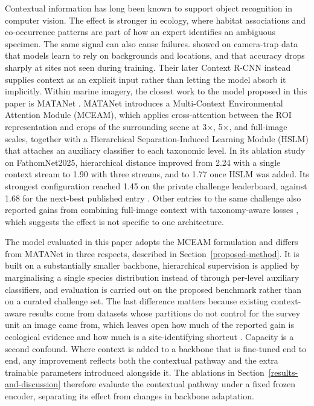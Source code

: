 \documentclass[preprint,12pt]{elsarticle}
\begin{document}
Contextual information has long been known to support object recognition
in computer vision\citep{ref53,ref54,ref55,ref56}. The effect is stronger in ecology,
where habitat associations and co-occurrence patterns are part of how an
expert identifies an ambiguous specimen. The same signal can also cause
failures. \citet{ref18} showed on
camera-trap data that models learn to rely on backgrounds and locations,
and that accuracy drops sharply at sites not seen during training. Their
later Context R-CNN \citep{ref57} instead
supplies context as an explicit input rather than letting the model
absorb it implicitly. Within marine imagery, the closest work to the
model proposed in this paper is MATANet
\citep{ref26}. MATANet introduces a Multi-Context
Environmental Attention Module (MCEAM), which applies cross-attention
between the ROI representation and crops of the surrounding scene at 3×,
5×, and full-image scales, together with a Hierarchical
Separation-Induced Learning Module (HSLM) that attaches an auxiliary
classifier to each taxonomic level. In its ablation study on
FathomNet2025\citep{ref30}, hierarchical distance
improved from 2.24 with a single context stream to 1.90 with three
streams, and to 1.77 once HSLM was added. Its strongest configuration
reached 1.45 on the private challenge leaderboard, against 1.68 for the
next-best published entry \citep{ref26}. Other
entries to the same challenge also reported gains from combining
full-image context with taxonomy-aware losses
\citep{ref30}, which suggests the effect is not
specific to one architecture.

The model evaluated in this paper adopts the MCEAM formulation and
differs from MATANet \citep{ref26} in three
respects, described in Section~\ref{proposed-method}. It is built on a substantially smaller
backbone, hierarchical supervision is applied by marginalising a single
species distribution instead of through per-level auxiliary classifiers,
and evaluation is carried out on the proposed benchmark rather than on a
curated challenge set. The last difference matters because existing
context-aware results come from datasets whose partitions do not control
for the survey unit an image came from, which leaves open how much of
the reported gain is ecological evidence and how much is a
site-identifying shortcut \citep{ref17,ref18,ref58} . Capacity is a second confound.
Where context is added to a backbone that is fine-tuned end to end, any
improvement reflects both the contextual pathway and the extra trainable
parameters introduced alongside it. The ablations in Section~\ref{results-and-discussion} therefore
evaluate the contextual pathway under a fixed frozen encoder, separating
its effect from changes in backbone adaptation.
\end{document}

